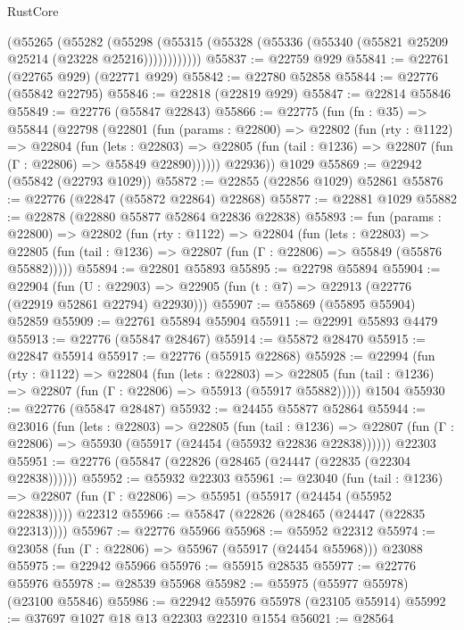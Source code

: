 \begin{lexlean}{RustCore}
\begin{coremodule}
          (@55265
            (@55282
              (@55298
                (@55315 (@55328 (@55336 (@55340 (@55821 @25209 @25214 (@23228 @25216))))))))))))
@55837 := @22759 @929
@55841 := @22761 (@22765 @929) (@22771 @929)
@55842 := @22780 @52858
@55844 := @22776 (@55842 @22795)
@55846 := @22818 (@22819 @929)
@55847 := @22814 @55846
@55849 := @22776 (@55847 @22843)
@55866 := @22775
    (fun (fn : @35) =>
    @55844
      (@22798
        (@22801
          (fun (params : @22800) =>
          @22802
            (fun (rty : @1122) =>
            @22804
              (fun (lets : @22803) =>
              @22805 (fun (tail : @1236) => @22807 (fun (Γ : @22806) => @55849 @22890))))))
        @22936))
    @1029
@55869 := @22942 (@55842 (@22793 @1029))
@55872 := @22855 (@22856 @1029) @52861
@55876 := @22776 (@22847 (@55872 @22864) @22868)
@55877 := @22881 @1029
@55882 := @22878 (@22880 @55877 @52864 @22836 @22838)
@55893 := fun (params : @22800) =>
  @22802
    (fun (rty : @1122) =>
    @22804
      (fun (lets : @22803) =>
      @22805 (fun (tail : @1236) => @22807 (fun (Γ : @22806) => @55849 (@55876 @55882)))))
@55894 := @22801 @55893
@55895 := @22798 @55894
@55904 := @22904
    (fun (U : @22903) => @22905 (fun (t : @7) => @22913 (@22776 (@22919 @52861 @22794) @22930)))
@55907 := @55869 (@55895 @55904) @52859
@55909 := @22761 @55894 @55904
@55911 := @22991 @55893 @4479
@55913 := @22776 (@55847 @28467)
@55914 := @55872 @28470
@55915 := @22847 @55914
@55917 := @22776 (@55915 @22868)
@55928 := @22994
    (fun (rty : @1122) =>
    @22804
      (fun (lets : @22803) =>
      @22805 (fun (tail : @1236) => @22807 (fun (Γ : @22806) => @55913 (@55917 @55882)))))
    @1504
@55930 := @22776 (@55847 @28487)
@55932 := @24455 @55877 @52864
@55944 := @23016
    (fun (lets : @22803) =>
    @22805
      (fun (tail : @1236) =>
      @22807 (fun (Γ : @22806) => @55930 (@55917 (@24454 (@55932 @22836 @22838))))))
    @22303
@55951 := @22776 (@55847 (@22826 (@28465 (@24447 (@22835 (@22304 @22838))))))
@55952 := @55932 @22303
@55961 := @23040
    (fun (tail : @1236) => @22807 (fun (Γ : @22806) => @55951 (@55917 (@24454 (@55952 @22838)))))
    @22312
@55966 := @55847 (@22826 (@28465 (@24447 (@22835 @22313))))
@55967 := @22776 @55966
@55968 := @55952 @22312
@55974 := @23058 (fun (Γ : @22806) => @55967 (@55917 (@24454 @55968))) @23088
@55975 := @22942 @55966
@55976 := @55915 @28535
@55977 := @22776 @55976
@55978 := @28539 @55968
@55982 := @55975 (@55977 @55978) (@23100 @55846)
@55986 := @22942 @55976 @55978 (@23105 @55914)
@55992 := @37697 @1027 @18 @13 @22303 @22310 @1554
@56021 := @28564

\end{coremodule}
\end{lexlean}
